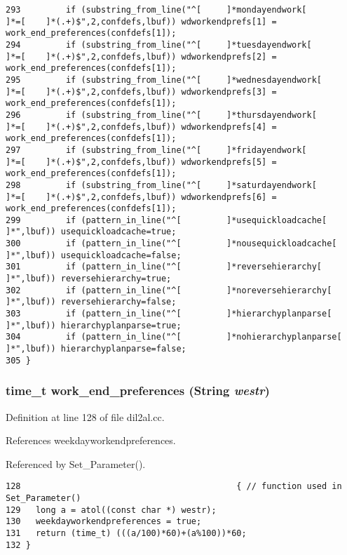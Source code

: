 \begin{verbatim}
293         if (substring_from_line("^[     ]*mondayendwork[        ]*=[    ]*(.+)$",2,confdefs,lbuf)) wdworkendprefs[1] = work_end_preferences(confdefs[1]);
294         if (substring_from_line("^[     ]*tuesdayendwork[       ]*=[    ]*(.+)$",2,confdefs,lbuf)) wdworkendprefs[2] = work_end_preferences(confdefs[1]);
295         if (substring_from_line("^[     ]*wednesdayendwork[     ]*=[    ]*(.+)$",2,confdefs,lbuf)) wdworkendprefs[3] = work_end_preferences(confdefs[1]);
296         if (substring_from_line("^[     ]*thursdayendwork[      ]*=[    ]*(.+)$",2,confdefs,lbuf)) wdworkendprefs[4] = work_end_preferences(confdefs[1]);
297         if (substring_from_line("^[     ]*fridayendwork[        ]*=[    ]*(.+)$",2,confdefs,lbuf)) wdworkendprefs[5] = work_end_preferences(confdefs[1]);
298         if (substring_from_line("^[     ]*saturdayendwork[      ]*=[    ]*(.+)$",2,confdefs,lbuf)) wdworkendprefs[6] = work_end_preferences(confdefs[1]);
299         if (pattern_in_line("^[         ]*usequickloadcache[    ]*",lbuf)) usequickloadcache=true;
300         if (pattern_in_line("^[         ]*nousequickloadcache[  ]*",lbuf)) usequickloadcache=false;
301         if (pattern_in_line("^[         ]*reversehierarchy[     ]*",lbuf)) reversehierarchy=true;
302         if (pattern_in_line("^[         ]*noreversehierarchy[   ]*",lbuf)) reversehierarchy=false;
303         if (pattern_in_line("^[         ]*hierarchyplanparse[   ]*",lbuf)) hierarchyplanparse=true;
304         if (pattern_in_line("^[         ]*nohierarchyplanparse[         ]*",lbuf)) hierarchyplanparse=false;
305 }
\end{verbatim}\normalsize 
{}
\subsubsection{\setlength{\rightskip}{0pt plus 5cm}time\_\-t work\_\-end\_\-preferences ({\bf String} {\em westr})}\label{dil2al_8cc_a99}




Definition at line 128 of file dil2al.cc.

References weekdayworkendpreferences.

Referenced by Set\_\-Parameter().



\footnotesize\begin{verbatim}128                                           { // function used in Set_Parameter()
129   long a = atol((const char *) westr);
130   weekdayworkendpreferences = true;
131   return (time_t) (((a/100)*60)+(a%100))*60;
132 }
\end{verbatim}\normalsize 


